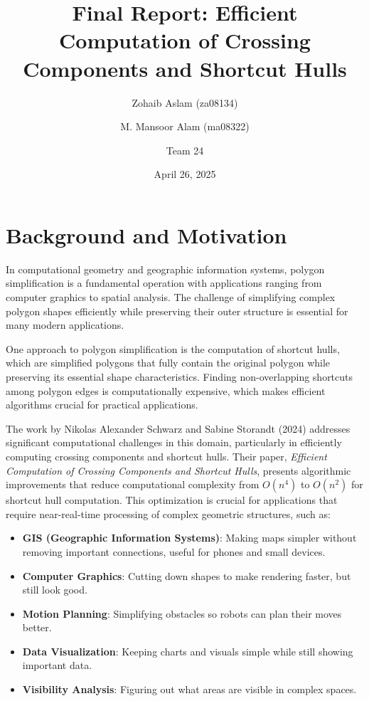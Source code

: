 \documentclass[11pt]{article}
\title{Final Report: Efficient Computation of Crossing Components and Shortcut Hulls}
\author{Zohaib Aslam (za08134) \and M. Mansoor Alam (ma08322) \and Team 24}
\date{April 26, 2025}
\begin{document}
\maketitle

\section{Background and Motivation}

In computational geometry and geographic information systems, polygon simplification is a fundamental operation with applications ranging from computer graphics to spatial analysis. The challenge of simplifying complex polygon shapes efficiently while preserving their outer structure is essential for many modern applications.

One approach to polygon simplification is the computation of shortcut hulls, which are simplified polygons that fully contain the original polygon while preserving its essential shape characteristics. Finding non-overlapping shortcuts among polygon edges is computationally expensive, which makes efficient algorithms crucial for practical applications.

The work by Nikolas Alexander Schwarz and Sabine Storandt (2024) addresses significant computational challenges in this domain, particularly in efficiently computing crossing components and shortcut hulls. Their paper, \textit{Efficient Computation of Crossing Components and Shortcut Hulls}, presents algorithmic improvements that reduce computational complexity from $O(n^4)$ to $O(n^2)$ for shortcut hull computation. This optimization is crucial for applications that require near-real-time processing of complex geometric structures, such as:

\begin{itemize}

    \item \textbf{GIS (Geographic Information Systems)}: Making maps simpler without removing important connections, useful for phones and small devices.
    \item \textbf{Computer Graphics}: Cutting down shapes to make rendering faster, but still look good.
    \item \textbf{Motion Planning}: Simplifying obstacles so robots can plan their moves better.
    \item \textbf{Data Visualization}: Keeping charts and visuals simple while still showing important data.
    \item \textbf{Visibility Analysis}: Figuring out what areas are visible in complex spaces.
\end{itemize}
\end{document}
